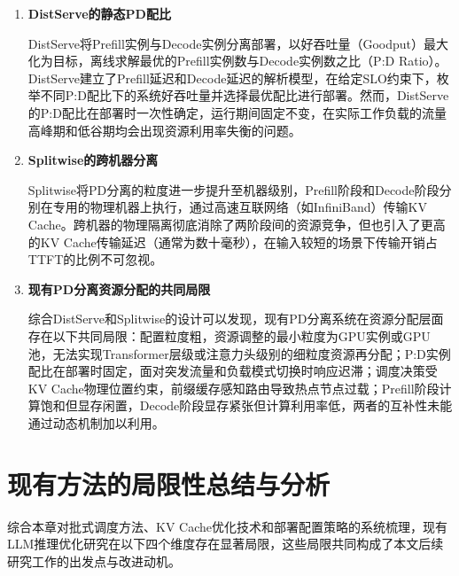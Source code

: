 \begin{enumerate}
\item \textbf{DistServe的静态PD配比}

DistServe\cite{zhong2024distserve}将Prefill实例与Decode实例分离部署，以好吞吐量（Goodput）最大化为目标，离线求解最优的Prefill实例数与Decode实例数之比（P:D Ratio）。DistServe建立了Prefill延迟和Decode延迟的解析模型，在给定SLO约束下，枚举不同P:D配比下的系统好吞吐量并选择最优配比进行部署。然而，DistServe的P:D配比在部署时一次性确定，运行期间固定不变，在实际工作负载的流量高峰期和低谷期均会出现资源利用率失衡的问题。

\item \textbf{Splitwise的跨机器分离}

Splitwise\cite{patel2024splitwise}将PD分离的粒度进一步提升至机器级别，Prefill阶段和Decode阶段分别在专用的物理机器上执行，通过高速互联网络（如InfiniBand）传输KV Cache。跨机器的物理隔离彻底消除了两阶段间的资源竞争，但也引入了更高的KV Cache传输延迟（通常为数十毫秒），在输入较短的场景下传输开销占TTFT的比例不可忽视。

\item \textbf{现有PD分离资源分配的共同局限}

综合DistServe和Splitwise的设计可以发现，现有PD分离系统在资源分配层面存在以下共同局限：配置粒度粗，资源调整的最小粒度为GPU实例或GPU池，无法实现Transformer层级或注意力头级别的细粒度资源再分配；P:D实例配比在部署时固定，面对突发流量和负载模式切换时响应迟滞；调度决策受KV Cache物理位置约束，前缀缓存感知路由导致热点节点过载；Prefill阶段计算饱和但显存闲置，Decode阶段显存紧张但计算利用率低，两者的互补性未能通过动态机制加以利用。

\end{enumerate}

\section{现有方法的局限性总结与分析}

综合本章对批式调度方法、KV Cache优化技术和部署配置策略的系统梳理，现有LLM推理优化研究在以下四个维度存在显著局限，这些局限共同构成了本文后续研究工作的出发点与改进动机。

